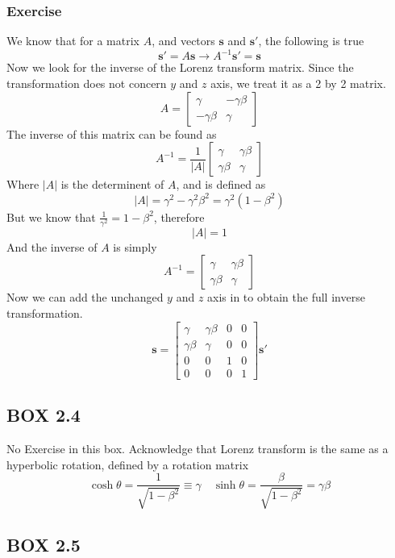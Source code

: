 \documentclass[12pt]{article}
\newcommand{\paren}[1]{\left( #1 \right)}
\newcommand{\abso}[1]{\left|#1 \right|}
\newcommand{\then}{\rightarrow}
\begin{document}
\subsubsection{Exercise}
We know that for a matrix $A$, and vectors $\mathbf{s}$ and $\mathbf{s}'$, the following is true
\[
\mathbf{s}' = A\mathbf{s} \then A^{-1}\mathbf{s}'=\mathbf{s}
\]
Now we look for the inverse of the Lorenz transform matrix. Since the transformation does not concern $y$ and $z$ axis, we treat it as a 2 by 2 matrix.
\[
A = \begin{bmatrix}
    \gamma & -\gamma\beta\\
    -\gamma\beta & \gamma
\end{bmatrix}
\]
The inverse of this matrix can be found as
\[
A^{-1} = \frac{1}{\abso{A}}\begin{bmatrix}
    \gamma & \gamma\beta\\
    \gamma\beta & \gamma
\end{bmatrix}
\]
Where $\abso{A}$ is the determinent of $A$, and is defined as
\[
\abso{A} = \gamma^2 -\gamma^2\beta^2 = \gamma^2\paren{1-\beta^2}
\]
But we know that $\frac{1}{\gamma^2} = 1 - \beta^2$, therefore
\[
\abso{A} = 1
\]
And the inverse of $A$ is simply 
\[
A^{-1} =\begin{bmatrix}
    \gamma & \gamma\beta\\
    \gamma\beta & \gamma
\end{bmatrix}
\]
Now we can add the unchanged $y$ and $z$ axis in to obtain the full inverse transformation.
\[
\mathbf{s} = \begin{bmatrix}
    \gamma & \gamma\beta & 0 & 0\\
    \gamma\beta & \gamma & 0 & 0\\
    0&0&1&0\\
    0&0&0&1
\end{bmatrix}\mathbf{s}'
\]

\subsection{BOX 2.4}
No Exercise in this box. Acknowledge that Lorenz transform is the same as a hyperbolic rotation, defined by a rotation matrix
\[
\cosh\theta = \frac{1}{\sqrt{1-\beta^2}} \equiv \gamma \quad \sinh\theta = \frac{\beta}{\sqrt{1-\beta^2}}=\gamma \beta
\]

\subsection{BOX 2.5}
\end{document}
